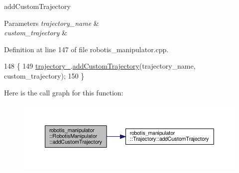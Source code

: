 add\+Custom\+Trajectory 


\begin{DoxyParams}{Parameters}
{\em trajectory\+\_\+name} & \\
\hline
{\em custom\+\_\+trajectory} & \\
\hline
\end{DoxyParams}


Definition at line 147 of file robotis\+\_\+manipulator.\+cpp.


\begin{DoxyCode}
148 \{
149   \hyperlink{classrobotis__manipulator_1_1_robotis_manipulator_a992d2c7221bcaab8e9a688d12728d738}{trajectory\_}.\hyperlink{classrobotis__manipulator_1_1_trajectory_a4d7f38c0e931889ba513dfa1a9fae3df}{addCustomTrajectory}(trajectory\_name, custom\_trajectory);
150 \}
\end{DoxyCode}


Here is the call graph for this function\+:\nopagebreak
\begin{figure}[H]
\begin{center}
\leavevmode
\includegraphics[width=350pt]{classrobotis__manipulator_1_1_robotis_manipulator_a5d60df52f23bed89642b39af84046aa5_cgraph}
\end{center}
\end{figure}


